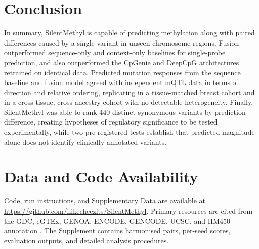 \documentclass[10pt,letterpaper,twocolumn]{article}
\begin{document}
\section{Conclusion}
In summary, SilentMethyl is capable of predicting methylation along with paired
differences caused by a single variant in unseen chromosome regions. Fusion
outperformed sequence-only and context-only baselines for single-probe
prediction{\color{addedred}, and also outperformed the CpGenie and DeepCpG
architectures retrained on identical data}. Predicted mutation responses from the
sequence baseline and fusion model agreed with independent mQTL data in terms of
direction and relative ordering{\color{addedred}, replicating in a
tissue-matched breast cohort and in a cross-tissue, cross-ancestry cohort with no
detectable heterogeneity}. Finally, SilentMethyl was able to rank 440 distinct
synonymous variants by prediction difference, creating hypotheses of regulatory
significance to be tested experimentally{\color{addedred}, while two
pre-registered tests establish that predicted magnitude alone does not identify
clinically annotated variants}.

\section{Data and Code Availability}

Code, run instructions, and Supplementary Data are available at
\url{https://github.com/ilikecheezits/SilentMethyl}. Primary resources are cited
from the GDC, eGTEx, GENOA, ENCODE, GENCODE, UCSC, and HM450 annotation
\cite{grossman2016gdc,oliva2023mqtl,shang2023genoa,encode2012integrated,frankish2021gencode,kent2002ucsc,zhou2017infinium}.
The Supplement contains harmonised pairs, per-seed scores, evaluation outputs,
and detailed analysis procedures.

\balance
\end{document}
